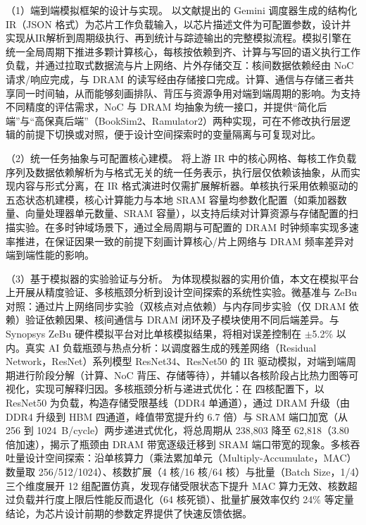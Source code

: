 （1）端到端模拟框架的设计与实现。 以文献\parencite{cai2024gemini}提出的 Gemini 调度器生成的结构化 IR（JSON 格式）为芯片工作负载输入，以芯片描述文件为可配置参数，设计并实现从IR解析到周期级执行、再到统计与踪迹输出的完整模拟流程。模拟引擎在统一全局周期下推进多颗计算核心，每核按依赖到齐、计算与写回的语义执行工作负载，并通过拉取式数据流与片上网络、片外存储交互：核间数据依赖经由 NoC 请求/响应完成，与 DRAM 的读写经由存储接口完成。计算、通信与存储三者共享同一时间轴，从而能够刻画排队、背压与资源争用对端到端周期的影响。为支持不同精度的评估需求，NoC 与 DRAM 均抽象为统一接口，并提供“简化后端”与“高保真后端”（BookSim2、Ramulator2）两种实现，可在不修改执行层逻辑的前提下切换或对照，便于设计空间探索时的变量隔离与可复现对比。

（2）统一任务抽象与可配置核心建模。 将上游 IR 中的核心网格、每核工作负载序列及数据依赖解析为与格式无关的统一任务表示，执行层仅依赖该抽象，从而实现内容与形式分离，在 IR 格式演进时仅需扩展解析器。单核执行采用依赖驱动的五态状态机建模，核心计算能力与本地 SRAM 容量均参数化配置（如乘加器数量、向量处理器单元数量、SRAM 容量），以支持后续对计算资源与存储配置的扫描实验。在多时钟域场景下，通过全局周期与可配置的 DRAM 时钟频率实现多速率推进，在保证因果一致的前提下刻画计算核心/片上网络与 DRAM 频率差异对端到端性能的影响。

（3）基于模拟器的实验验证与分析。 为体现模拟器的实用价值，本文在模拟平台上开展从精度验证、多核瓶颈分析到设计空间探索的系统性实验。微基准与 ZeBu 对照：通过片上网络同步实验（双核点对点依赖）与内存同步实验（仅 DRAM 依赖）验证依赖因果、核间通信与 DRAM 闭环及子模块使用不同后端差异。与 Synopsys ZeBu 硬件模拟平台对比单核模拟结果，将相对误差控制在 $\pm$5.2\% 以内。真实 AI 负载瓶颈与热点分析：以调度器生成的残差网络（Residual Network，ResNet）系列模型 ResNet34、ResNet50 的 IR 驱动模拟，对端到端周期进行阶段分解（计算、NoC 背压、存储等待），并辅以各核阶段占比热力图等可视化，实现可解释归因。多核瓶颈分析与递进式优化：在 四核配置下，以 ResNet50 为负载，构造存储受限基线（DDR4 单通道），通过 DRAM 升级（由 DDR4 升级到 HBM 四通道，峰值带宽提升约 6.7 倍）与 SRAM 端口加宽（从 256 到 \SI{1024}{B/cycle}）两步递进式优化，将总周期从 238,803 降至 62,818（3.80 倍加速），揭示了瓶颈由 DRAM 带宽逐级迁移到 SRAM 端口带宽的现象。多核吞吐量设计空间探索：沿单核算力（乘法累加单元（Multiply-Accumulate，MAC）数量取 256/512/1024）、核数扩展（4 核/16 核/64 核）与批量（Batch Size，1/4）三个维度展开 12 组配置仿真，发现存储受限状态下提升 MAC 算力无效、核数超过负载并行度上限后性能反而退化（64 核死锁）、批量扩展效率仅约 24\% 等定量结论，为芯片设计前期的参数定界提供了快速反馈依据。

